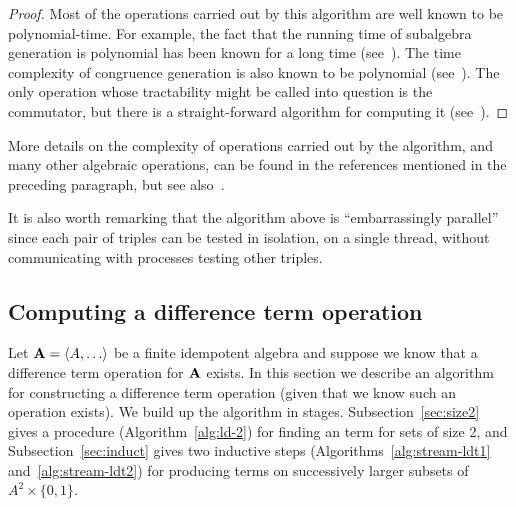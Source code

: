 \begin{proof}
    Most of the operations carried out by this algorithm are well known to be
    polynomial-time.  For example, the fact that the running time of 
    subalgebra generation is polynomial has been known for a long time (see~\cite{MR0455543}).
    The time complexity of congruence generation is also known to be polynomial
    (see~\cite{MR2470585}).  The only operation whose tractability might be
    called into question is the commutator, but there is a straight-forward
    algorithm for computing it (see~\cite{2017arXiv170302764D}).
\end{proof}


More details on the complexity of operations carried out by the algorithm, and
many other algebraic operations, can be found in the references mentioned in the
preceding paragraph, but see also~\cite{MR1871085,MR1695293,Freese:2009}.

It is also worth remarking that the algorithm above is ``embarrassingly parallel''
since each pair of triples can be tested in isolation, on a single thread,
without communicating with processes testing other triples.

\subsection{Computing a difference term operation}
\label{sec:comp-diff-term}
Let $\alg{A} = \<A, \dots\>$ be a finite idempotent algebra and suppose we 
know that a difference term operation for $\mathbf{A}$ exists.  In this section we
describe an algorithm for constructing a difference term operation
(given that we know such an operation exists). 
We build up the algorithm in stages. Subsection~\ref{sec:size2}
gives a procedure (Algorithm~\ref{alg:ld-2}) for finding an \ld term for sets 
of size 2, and Subsection~\ref{sec:induct} gives two inductive steps 
(Algorithms~\ref{alg:stream-ldt1} and~\ref{alg:stream-ldt2}) 
for producing \ld terms on successively larger subsets of $A^2 \times \{0,1\}$.

